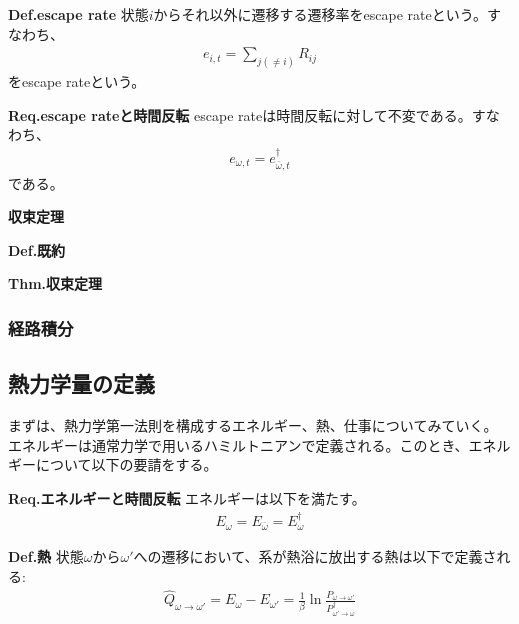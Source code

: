 \documentclass[a4paper,11pt]{jsarticle}
\numberwithin{equation}{section}
\begin{document}
\begin{itembox}[l]{\textbf{Def.escape rate}}
  状態$i$からそれ以外に遷移する遷移率をescape rateという。すなわち、
  \begin{align}
    e_{i,t} = \sum_{j (\neq i)}R_{ij}
  \end{align}
  をescape rateという。
\end{itembox}

\begin{itembox}[l]{\textbf{Req.escape rateと時間反転}}
  escape rateは時間反転に対して不変である。すなわち、
  \begin{align}
    e_{\omega,t} = e_{\bar{\omega},t}^{\dagger}
  \end{align}
  である。
\end{itembox}


\textbf{収束定理}\\
\begin{itembox}[l]{\textbf{Def.既約}}

\end{itembox}

\begin{itembox}[l]{\textbf{Thm.収束定理}}

\end{itembox}





\subsubsection{経路積分}

\subsection{熱力学量の定義}
まずは、熱力学第一法則を構成するエネルギー、熱、仕事についてみていく。\\
エネルギーは通常力学で用いるハミルトニアンで定義される。このとき、エネルギーについて以下の要請をする。\\
\begin{itembox}[l]{\textbf{Req.エネルギーと時間反転}}
  エネルギーは以下を満たす。
  \begin{align}
    E_{\omega} = E_{\bar{\omega}} = E_{\omega}^{\dagger}
  \end{align}

\end{itembox}

\begin{itembox}[l]{\textbf{Def.熱}}
  状態$\omega$から$\omega'$への遷移において、系が熱浴に放出する熱は以下で定義される:
  \begin{align}
    \hat{Q}_{\omega \to \omega'} = E_{\omega} - E_{\omega'} = \frac{1}{\beta}\ln \frac{P_{\omega \to \omega'}}{P_{\omega' \to \omega}^{\dagger}}
  \end{align}
\end{itembox}
\end{document}
